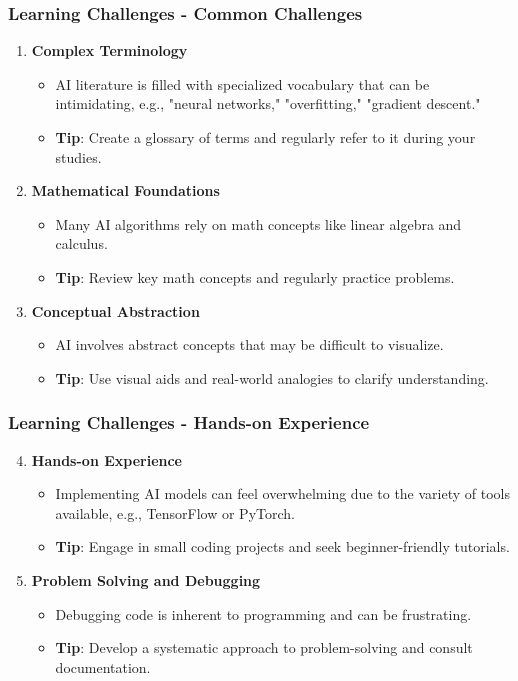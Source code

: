 \documentclass[aspectratio=169]{beamer}
\begin{document}
\begin{frame}[fragile]
    \frametitle{Learning Challenges - Common Challenges}
    \begin{enumerate}
        \item \textbf{Complex Terminology}
        \begin{itemize}
            \item AI literature is filled with specialized vocabulary that can be intimidating, e.g., "neural networks," "overfitting," "gradient descent."
            \item \textbf{Tip}: Create a glossary of terms and regularly refer to it during your studies.
        \end{itemize}
        
        \item \textbf{Mathematical Foundations}
        \begin{itemize}
            \item Many AI algorithms rely on math concepts like linear algebra and calculus.
            \item \textbf{Tip}: Review key math concepts and regularly practice problems.
        \end{itemize}
        
        \item \textbf{Conceptual Abstraction}
        \begin{itemize}
            \item AI involves abstract concepts that may be difficult to visualize.
            \item \textbf{Tip}: Use visual aids and real-world analogies to clarify understanding.
        \end{itemize}
    \end{enumerate}
\end{frame}

\begin{frame}[fragile]
    \frametitle{Learning Challenges - Hands-on Experience}
    \begin{enumerate}
        \setcounter{enumi}{3} %
        \item \textbf{Hands-on Experience}
        \begin{itemize}
            \item Implementing AI models can feel overwhelming due to the variety of tools available, e.g., TensorFlow or PyTorch.
            \item \textbf{Tip}: Engage in small coding projects and seek beginner-friendly tutorials.
        \end{itemize}
        
        \item \textbf{Problem Solving and Debugging}
        \begin{itemize}
            \item Debugging code is inherent to programming and can be frustrating.
            \item \textbf{Tip}: Develop a systematic approach to problem-solving and consult documentation.
        \end{itemize}
    \end{enumerate}
\end{frame}
\end{document}
